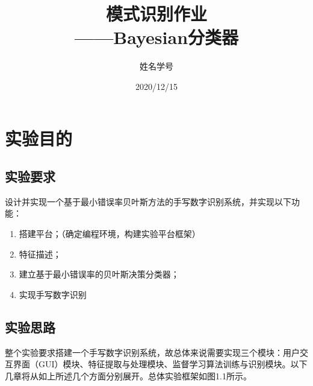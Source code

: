 \documentclass[UTF8, a4paper, 12pt]{report}
\title{模式识别作业\\——Bayesian分类器}
\author{姓名学号}
\date{2020/12/15}
\begin{document}
\maketitle %
\thispagestyle{empty} %
\clearpage %

\pagestyle{plain} %
\setcounter{page}{1} %
\tableofcontents %
\clearpage

\pagestyle{fancy} %
\setcounter{page}{1} %

\chapter{实验目的}
	\section{实验要求}
		设计并实现一个基于最小错误率贝叶斯方法的手写数字识别系统，并实现以下功能：
		\begin{enumerate}[itemindent=1em]
			\renewcommand{\labelenumi}{\theenumi)}
			\item 搭建平台；（确定编程环境，构建实验平台框架）
			\item 特征描述；
			\item 建立基于最小错误率的贝叶斯决策分类器；
			\item 实现手写数字识别
		\end{enumerate}

	\section{实验思路}
		整个实验要求搭建一个手写数字识别系统，故总体来说需要实现三个模块：用户交互界面（GUI）模块、特征提取与处理模块、监督学习算法训练与识别模块。以下几章将从如上所述几个方面分别展开。总体实验框架如图1.1所示。
\end{document}

